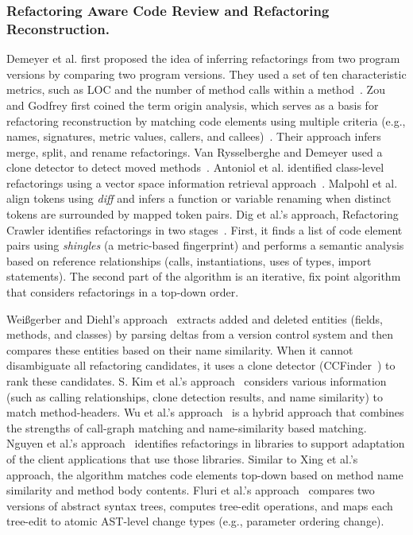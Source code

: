 \documentclass[runningheads,a4paper]{llncs}
\begin{document}
\subsubsection{Refactoring Aware Code Review and Refactoring Reconstruction.}  
Demeyer {et al.} first proposed the idea of inferring refactorings from two program versions by comparing two program versions. They used a set of ten characteristic metrics, such as LOC and the number of method calls within a method~\cite{Demeyer2000}. Zou and Godfrey first coined the term origin analysis, which serves as a basis for refactoring reconstruction by matching code elements using multiple criteria (e.g., names, signatures, metric values, callers, and callees)~\cite{Zou2005}. Their approach infers merge, split, and rename refactorings. Van Rysselberghe and Demeyer used a clone detector to detect moved methods~\cite{Rysselberghe2003}.  Antoniol {et al.} identified class-level refactorings using a vector space information retrieval approach~\cite{Antoniol2004}. Malpohl {et al.} \cite{Malpohl2000} align tokens using {\it diff} and infers a function or variable renaming when distinct tokens are surrounded by mapped token pairs. Dig et al.'s approach, {Refactoring Crawler} identifies refactorings in two stages~\cite{Dig2006}. First, it finds a list of code element pairs using {\em shingles} (a metric-based fingerprint) and performs a semantic analysis based on reference relationships (calls, instantiations, uses of types, import statements). The second part of the algorithm is an iterative, fix point algorithm that considers refactorings in a top-down order. 

Wei{\ss}gerber and Diehl's approach~\cite{Weissgerber2006} extracts added and deleted entities (fields, methods, and classes) by parsing deltas from a version control system and then compares these entities based on their {name similarity}. When it cannot disambiguate all refactoring candidates, it uses a {clone detector} (CCFinder~\cite{Kamiya2002}) to rank these candidates. S. Kim et al.'s approach~\cite{SKim2005} considers various information (such as {calling relationships}, {clone detection} results, and {name similarity}) to match method-headers.  Wu et al.'s approach~\cite{Wu2010:AHA} is a hybrid approach that combines the strengths of {call-graph matching} and {name-similarity} based matching. Nguyen et al.'s approach~\cite{Nguyen2010:GAA} identifies refactorings in libraries to support adaptation of the client applications that use those libraries. Similar to Xing et al.'s approach, the algorithm matches code elements top-down based on method name similarity and method body contents. Fluri et al.'s approach~\cite{FWP2007} compares two versions of abstract syntax trees, computes tree-edit operations, and maps each tree-edit to atomic AST-level change types (e.g., parameter ordering change).
\end{document}
